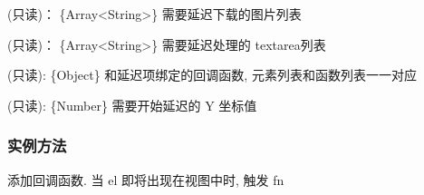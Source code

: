\documentclass[letterpaper,10pt,english]{sphinxmanual}
\begin{document}

\begin{fulllineitems}
\label{api/component/datalazyload/index:DataLazyload.images}
(只读)： \{Array\textless{}String\textgreater{}\} 需要延迟下载的图片列表

\end{fulllineitems}



\begin{fulllineitems}
\label{api/component/datalazyload/index:DataLazyload.self.areaes}
(只读)： \{Array\textless{}String\textgreater{}\} 需要延迟处理的 textarea列表

\end{fulllineitems}



\begin{fulllineitems}
\label{api/component/datalazyload/index:DataLazyload.callbacks}
(只读): \{Object\} 和延迟项绑定的回调函数, 元素列表和函数列表一一对应

\end{fulllineitems}



\begin{fulllineitems}
\label{api/component/datalazyload/index:DataLazyload.threshold}
(只读): \{Number\} 需要开始延迟的 Y 坐标值

\end{fulllineitems}



\subsubsection{实例方法}
\label{api/component/datalazyload/index:id4}

\begin{fulllineitems}
\label{api/component/datalazyload/index:DataLazyload.addCallback}
添加回调函数. 当 el 即将出现在视图中时, 触发 fn

\end{fulllineitems}
\end{document}
